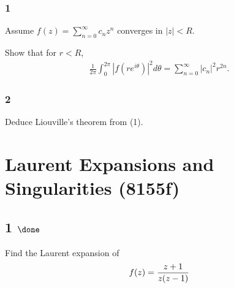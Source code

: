 \hypertarget{section-8}{%
\subsubsection{1}\label{section-8}}

Assume \(\displaystyle f(z) = \sum_{n=0}^\infty c_n z^n\) converges in
\(|z| < R\).

Show that for \(r <R\),
\begin{align*}
\frac{1}{2 \pi} \int_0^{2 \pi} |f(r e^{i \theta})|^2 d \theta = \sum_{n=0}^\infty |c_n|^2 r^{2n}
.\end{align*}

\hypertarget{section-9}{%
\subsubsection{2}\label{section-9}}

Deduce Liouville's theorem from (1).

\hypertarget{laurent-expansions-and-singularities-8155f}{%
\section{Laurent Expansions and Singularities
(8155f)}\label{laurent-expansions-and-singularities-8155f}}

\hypertarget{done-6}{%
\subsection{\texorpdfstring{1
\(\done\)}{1 \textbackslash done}}\label{done-6}}

Find the Laurent expansion of
\begin{align*}
f(z) = {z + 1 \over z(z-1)}
\end{align*}

